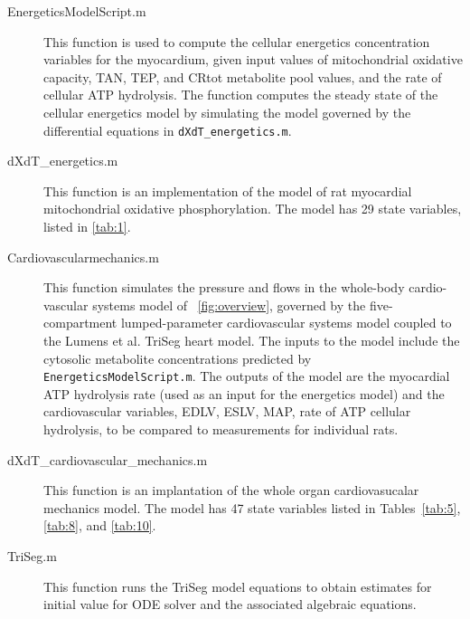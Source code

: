 \documentclass[fleqn,10pt]{physiome}
\begin{document}
\begin{description}

\item[EnergeticsModelScript.m] This function is used to compute the cellular energetics concentration variables for the myocardium, given input values of mitochondrial oxidative capacity, TAN, TEP, and CRtot metabolite pool values, and the rate of cellular ATP hydrolysis. The function computes the steady state of the cellular energetics model by simulating the model governed by the differential equations in \texttt{dXdT\_energetics.m}.

\item[dXdT\_energetics.m] This function is an implementation of the \cite{Bazil2016} model of rat myocardial mitochondrial oxidative phosphorylation. The model has 29 state variables, listed in \autoref{tab:1}.

\item[Cardiovascularmechanics.m] This function simulates the pressure and flows in the whole-body cardio-vascular systems model of ~\ref{fig:overview}, governed by the five-compartment lumped-parameter cardiovascular systems model coupled to the Lumens et al. TriSeg heart model. The inputs to the model include the cytosolic metabolite concentrations predicted by \texttt{EnergeticsModelScript.m}. The outputs of the model are the myocardial ATP hydrolysis rate (used as an input for the energetics model) and the cardiovascular variables, EDLV, ESLV, MAP, rate of ATP cellular hydrolysis, to be compared to measurements for individual rats.

\item[dXdT\_cardiovascular\_mechanics.m] This function is an implantation of the whole organ cardiovasucalar mechanics model. The model has 47 state variables listed in Tables~\ref{tab:5}, \ref{tab:8}, and \ref{tab:10}.

\item[TriSeg.m] This function runs the TriSeg model equations to obtain estimates for initial value for ODE solver and the associated algebraic equations.

\end{description}


\end{document}
